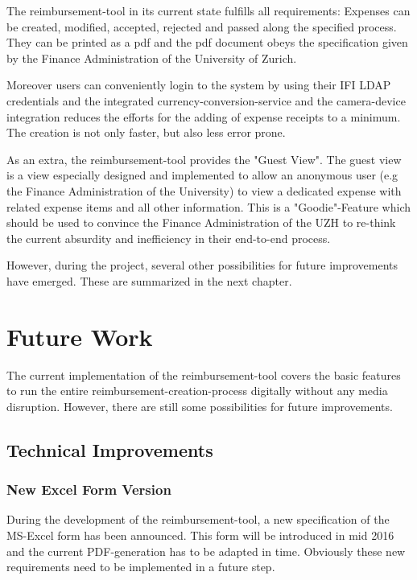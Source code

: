 The reimbursement-tool in its current state fulfills all requirements: Expenses can be created, modified, accepted, rejected and passed along the specified process. They can be printed as a pdf and the pdf document obeys the specification given by the Finance Administration of the University of Zurich. \par

Moreover users can conveniently login to the system by using their IFI LDAP credentials and the integrated currency-conversion-service and the camera-device integration reduces the efforts for the adding of expense receipts to a minimum. The creation is not only faster, but also less error prone.\par

As an extra, the reimbursement-tool provides the "Guest View". The guest view is a view especially designed and implemented to allow an anonymous user (e.g the Finance Administration of the University) to view a dedicated expense with related expense items and all other information. This is a "Goodie"-Feature which should be used to convince the Finance Administration of the UZH to re-think the current absurdity and inefficiency in their end-to-end process.\par

However, during the project, several other possibilities for future improvements have emerged. These are summarized in the next chapter.

\section{Future Work}
\label{sec:future-work}

The current implementation of the reimbursement-tool covers the basic features to run the entire reimbursement-creation-process digitally without any media disruption. However, there are still some possibilities for future improvements.

\subsection{Technical Improvements}
\subsubsection{New Excel Form Version}
During the development of the reimbursement-tool, a new specification of the MS-Excel form has been announced. This form will be introduced in mid 2016 and the current PDF-generation has to be adapted in time. Obviously these new requirements need to be implemented in a future step.

